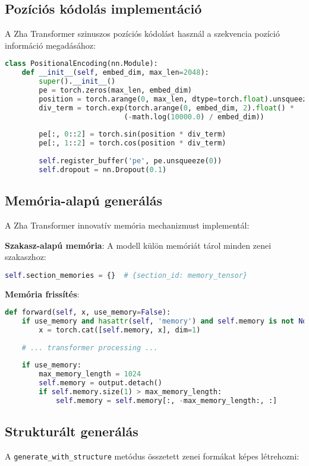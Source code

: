 \subsection{Pozíciós kódolás implementáció}
A Zha Transformer szinuszos pozíciós kódolást használ a szekvencia pozíció információ megadásához:

\begin{lstlisting}[language=Python]
class PositionalEncoding(nn.Module):
    def __init__(self, embed_dim, max_len=2048):
        super().__init__()
        pe = torch.zeros(max_len, embed_dim)
        position = torch.arange(0, max_len, dtype=torch.float).unsqueeze(1)
        div_term = torch.exp(torch.arange(0, embed_dim, 2).float() * 
                            (-math.log(10000.0) / embed_dim))
        
        pe[:, 0::2] = torch.sin(position * div_term)
        pe[:, 1::2] = torch.cos(position * div_term)
        
        self.register_buffer('pe', pe.unsqueeze(0))
        self.dropout = nn.Dropout(0.1)
\end{lstlisting}

\subsection{Memória-alapú generálás}
A Zha Transformer innovatív memória mechanizmust implementál:

\textbf{Szakasz-alapú memória}: A modell külön memóriát tárol minden zenei szakaszhoz:
\begin{lstlisting}[language=Python]
self.section_memories = {}  # {section_id: memory_tensor}
\end{lstlisting}

\textbf{Memória frissítés}:
\begin{lstlisting}[language=Python]
def forward(self, x, use_memory=False):
    if use_memory and hasattr(self, 'memory') and self.memory is not None:
        x = torch.cat([self.memory, x], dim=1)
    
    # ... transformer processing ...
    
    if use_memory:
        max_memory_length = 1024
        self.memory = output.detach()
        if self.memory.size(1) > max_memory_length:
            self.memory = self.memory[:, -max_memory_length:, :]
\end{lstlisting}

\subsection{Strukturált generálás}
A \texttt{generate\_with\_structure} metódus összetett zenei formákat képes létrehozni:

